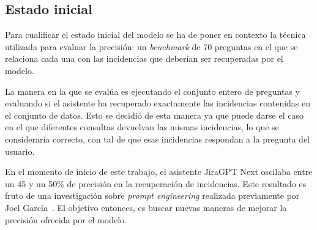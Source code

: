 \subsection{Estado inicial}
Para cualificar el estado inicial del modelo se ha de poner en contexto la técnica utilizada para evaluar la precisión: un \textit{benchmark} de 70 preguntas en el que se relaciona cada una con las incidencias que deberían ser recuperadas por el modelo.

La manera en la que se evalúa es ejecutando el conjunto entero de preguntas y evaluando si el asistente ha recuperado exactamente las incidencias contenidas en el conjunto de datos. Esto se decidió de esta manera ya que puede darse el caso en el que diferentes consultas devuelvan las mismas incidencias, lo que se consideraría correcto, con tal de que esas incidencias respondan a la pregunta del usuario.

En el momento de inicio de este trabajo, el asistente JiraGPT Next oscilaba entre un 45 y un 50\% de precisión en la recuperación de incidencias. Este resultado es fruto de una investigación sobre \textit{prompt engineering} realizada previamente por Joel García~\cite{jiragpt}. El objetivo entonces, es buscar nuevas maneras de mejorar la precisión ofrecida por el modelo.